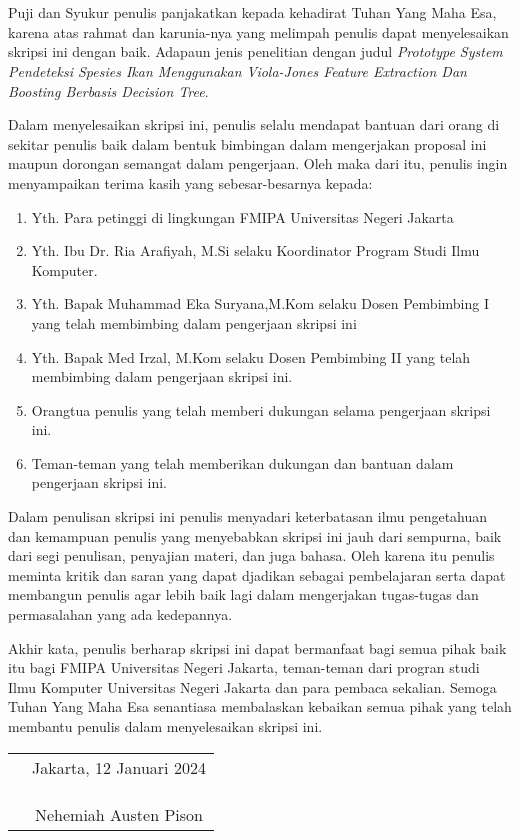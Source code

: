 \chapter*{}

Puji dan Syukur penulis panjakatkan kepada kehadirat Tuhan Yang Maha Esa, 
karena atas rahmat dan karunia-nya yang melimpah penulis dapat menyelesaikan
 skripsi ini dengan baik. Adapaun jenis penelitian dengan judul 
\textit{Prototype System Pendeteksi Spesies Ikan Menggunakan 
Viola-Jones Feature Extraction Dan Boosting Berbasis Decision Tree}.

Dalam menyelesaikan skripsi ini, penulis selalu mendapat bantuan dari orang 
di sekitar penulis baik dalam bentuk bimbingan dalam mengerjakan proposal 
ini maupun dorongan semangat dalam pengerjaan. Oleh maka dari itu, penulis 
ingin menyampaikan terima kasih yang sebesar-besarnya kepada:

\begin{enumerate}

	\item{Yth. Para petinggi di lingkungan FMIPA Universitas Negeri Jakarta}
	\item{Yth. Ibu Dr. Ria Arafiyah, M.Si selaku Koordinator Program Studi Ilmu
		Komputer.}
	\item{Yth. Bapak Muhammad Eka Suryana,M.Kom selaku Dosen Pembimbing I 
		yang telah membimbing dalam pengerjaan skripsi ini}
	\item{Yth. Bapak Med Irzal, M.Kom selaku Dosen Pembimbing II yang telah
		membimbing dalam pengerjaan skripsi ini.}
	\item{Orangtua penulis yang telah memberi dukungan selama pengerjaan
		 skripsi ini.}
	\item{Teman-teman yang telah memberikan dukungan dan bantuan dalam 
		pengerjaan skripsi ini.}
	
\end{enumerate}

Dalam penulisan skripsi ini penulis menyadari keterbatasan ilmu 
pengetahuan dan kemampuan penulis yang menyebabkan skripsi ini jauh dari 
sempurna, baik dari segi penulisan, penyajian materi, dan juga bahasa. Oleh 
karena itu penulis meminta kritik dan saran yang dapat djadikan sebagai 
pembelajaran serta dapat membangun penulis agar lebih baik lagi dalam mengerjakan 
tugas-tugas dan permasalahan yang ada kedepannya.

Akhir kata, penulis berharap skripsi ini dapat bermanfaat bagi semua 
pihak baik itu bagi FMIPA Universitas Negeri Jakarta, teman-teman dari progran 
studi Ilmu Komputer Universitas Negeri Jakarta dan para pembaca sekalian. 
Semoga Tuhan Yang Maha Esa senantiasa membalaskan kebaikan semua pihak yang 
telah membantu penulis dalam menyelesaikan skripsi ini.
\vspace{4cm}

\begin{tabular}{p{7.5cm}c}
	&Jakarta, 12 Januari 2024\\
	&\\
	&\\
	&\\
	&Nehemiah Austen Pison
\end{tabular}
